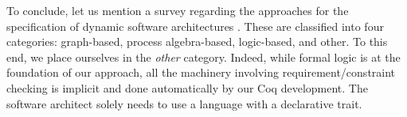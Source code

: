 		To conclude, let us mention a survey regarding the approaches for the specification of 
	dynamic software architectures \cite{Bradbury:2004:SSD:1075405.1075411}. These are 
	classified into four categories: graph-based, process algebra-based, 
	logic-based, and other. To this end, we place ourselves
	in the \textit{other} category. Indeed, while formal logic is at the foundation of 
	our approach, all the machinery involving requirement/constraint checking is 
	implicit and done automatically by our Coq development. The software architect 
	solely needs to use a language with a declarative trait. %
	
